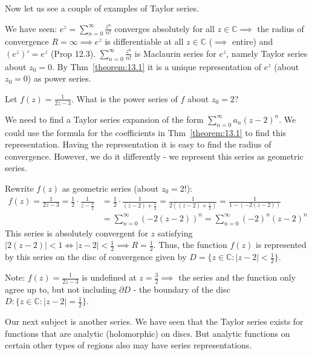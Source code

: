Now let us see a couple of examples of Taylor series.

\begin{example}\label{example:15.6} We have seen: $e^z = \sum_{n=0}^{\infty} \frac{z^n}{n!}$ converges absolutely for all $z \in \mathbb{C} \implies$ the radius of convergence $R = \infty \implies e^z$ is
differentiable at all $z \in \mathbb{C}$ ($\implies$ entire) and $(e^z)' = e^z$ (Prop 12.3). $\sum_{n=0}^{\infty} \frac{z^n}{n!}$ is Maclaurin series for $e^z$, namely Taylor series about $z_0 = 0$. By Thm~\ref{theorem:13.1} it is a unique representation of $e^z$ (about $z_0 = 0$) as power series.
\end{example}

\begin{example}\label{example:15.7}
Let $f(z) = \frac{1}{2z-3}$. What is the power series of $f$ about $z_0 = 2$?
\begin{soln}
    We need to find a Taylor series expansion of the form $\sum_{n=0}^{\infty} a_n (z-2)^n$. We could use the formula for the coefficients in Thm~\ref{theorem:13.1} to find this representation. Having the representation it is easy to find the radius of convergence. However, we do it differently - we represent this series as geometric series.
    
    Rewrite $f(z)$ as geometric series (about $z_0 = 2$!):
    \begin{align*}
        f(z) = \frac{1}{2z-3} = \frac{1}{2} \cdot \frac{1}{z - \frac{3}{2}} & = \frac{1}{2} \cdot \frac{1}{(z-2) + \frac{1}{2}} = \frac{1}{2((z-2) + \frac{1}{2})} = \frac{1}{1 - (-2(z-2))} \\
        & = \sum_{n=0}^{\infty} (-2(z-2))^n = \sum_{n=0}^{\infty} (-2)^n (z-2)^n 
    \end{align*}
    This series is absolutely convergent for $z$ satisfying $|2(z-2)| < 1 \iff |z-2| < \frac{1}{2} \implies R = \frac{1}{2}$. Thus, the function $f(z)$ is represented by this series on the disc of convergence given by $D = \{z \in \mathbb{C}: |z-2| < \frac{1}{2}\}$.
\end{soln}
\end{example}

Note: $f(z) = \frac{1}{2z-3}$ is undefined at $z = \frac{3}{2} \implies$ the series and the function only agree up to, but not including $\partial D$ - the boundary of the disc $D: \{z \in \mathbb{C}: |z-2| = \frac{1}{2}\}$.

Our next subject is another series. We have seen that the Taylor series exists for functions that are analytic (holomorphic) on discs. But analytic functions on certain other types of regions also may have series representations.

